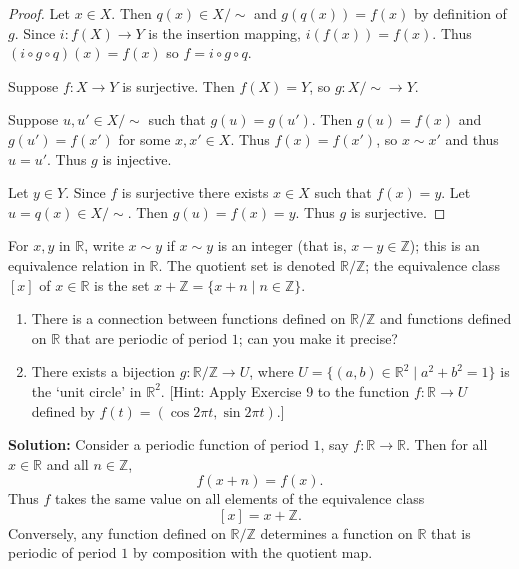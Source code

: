 \begin{proof}
    Let $x \in X$.
    Then $q(x) \in X/\sim$ and $g(q(x)) = f(x)$ by definition of $g$.
    Since $i : f(X) \to Y$ is the insertion mapping, $i(f(x)) = f(x)$.
    Thus $(i \circ g \circ q)(x) = f(x)$ so $f = i \circ g \circ q$.

    Suppose $f : X \longrightarrow Y$ is surjective.
    Then $f(X) = Y$, so $g : X/\sim \longrightarrow Y$.

    Suppose $u, u' \in X / \sim$ such that $g(u) = g(u')$.
    Then $g(u) = f(x)$ and $g(u') = f(x')$ for some $x, x' \in X$.
    Thus $f(x) = f(x')$, so $x \sim x'$ and thus $u = u'$.
    Thus $g$ is injective.

    Let $y \in Y$.
    Since $f$ is surjective there exists $x \in X$ such that $f(x) = y$.
    Let $u = q(x) \in X/\sim$.
    Then $g(u) = f(x) = y$.
    Thus $g$ is surjective.
\end{proof}


\begin{tcolorbox}[title=Problem 10, breakable]
    For $x, y$ in $\mathbb{R}$, write $x \sim y$ if $x \sim y$ is an integer (that is, $x - y \in \mathbb{Z}$);
    this is an equivalence relation in $\mathbb{R}$. The quotient set is denoted $\mathbb{R} / \mathbb{Z}$; the 
    equivalence class $[x]$ of $x \in \mathbb{R}$ is the set $x + \mathbb{Z} = \{x + n \mid n \in \mathbb{Z}\}$.
    \begin{enumerate}
        \item There is a connection between functions defined on $\mathbb{R} / \mathbb{Z}$ and functions defined 
              on $\mathbb{R}$ that are periodic of period $1$; can you make it precise?
        \item There exists a bijection $g : \mathbb{R} / \mathbb{Z} \longrightarrow U$, where 
                    $U = \{(a, b) \in \mathbb{R}^2 \mid a^2 + b^2 = 1\}$ is the `unit circle' in $\mathbb{R}^2$.
                [Hint: Apply Exercise 9 to the function $f : \mathbb{R} \longrightarrow U$ defined by 
                $f(t) = (\cos 2 \pi t, \sin 2 \pi t)$.]
    \end{enumerate}
\end{tcolorbox}

\textbf{Solution: }
Consider a periodic function of period $1$, say 
$f : \mathbb{R} \longrightarrow \mathbb{R}$.
Then for all $x \in \mathbb{R}$ and all $n \in \mathbb{Z}$,
\[
f(x+n) = f(x).
\]
Thus $f$ takes the same value on all elements of the equivalence class
\[
[x] = x + \mathbb{Z}.
\]
Conversely, any function defined on $\mathbb{R}/\mathbb{Z}$ determines
a function on $\mathbb{R}$ that is periodic of period $1$ by composition
with the quotient map.

